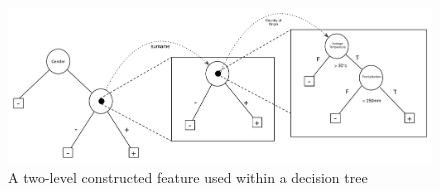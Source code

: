 \documentclass[twoside,11pt]{article}
\theoremstyle{definition}
\begin{document}
\begin{figure}[t]
	\centering
	\includegraphics[width=\linewidth]{fig3.pdf}
	\caption{A two-level constructed feature used within a decision tree}
	\label{fig:lvl2_tree}
\end{figure}





\end{document}
